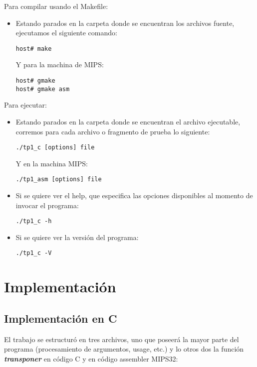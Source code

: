 \documentclass[a4paper]{article}
\begin{document}
Para compilar usando el Makefile:
\begin{itemize}
\item Estando parados en la carpeta donde se encuentran los archivos fuente, ejecutamos el siguiente comando:
\begin{verbatim}
host# make
\end{verbatim}
Y para la machina de MIPS:
\begin{verbatim}
host# gmake
host# gmake asm
\end{verbatim}
\end{itemize}

Para ejecutar:
\begin{itemize}
\item Estando parados en la carpeta donde se encuentran el archivo ejecutable, corremos para cada archivo o fragmento de prueba lo siguiente:
\begin{verbatim}
./tp1_c [options] file
\end{verbatim}
Y en la machina MIPS:
\begin{verbatim}
./tp1_asm [options] file
\end{verbatim}
\item Si se quiere ver el help, que especifica las opciones disponibles al momento de invocar el programa:
\begin{verbatim}
./tp1_c -h
\end{verbatim}
\item Si se quiere ver la versión del programa:
\begin{verbatim}
./tp1_c -V
\end{verbatim}
\end{itemize}

\section{Implementación}
\subsection{Implementación en C}

El trabajo se estructuró en tres archivos, uno que poseerá la mayor parte del programa (procesamiento de argumentos, usage, etc.) y lo otros dos la función \textbf{\textit{transponer}} en código C y en código assembler MIPS32:
\end{document}
